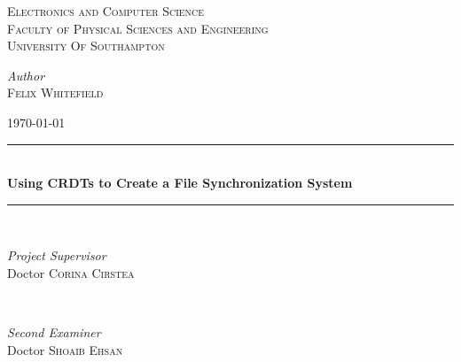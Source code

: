 \documentclass[12pt]{article}
\begin{document}
\begin{titlepage} %
    \newcommand{\HRule}{\rule{\linewidth}{0.5mm}} %

    \center %


    \textsc{\Large Electronics and Computer Science}\\[0.5cm] %

    \textsc{\large Faculty of Physical Sciences and Engineering}\\[0.5cm] %

    \textsc{\LARGE University Of Southampton}\\[1.5cm] %

    \begin{center}
        \large
        \textit{Author}\\
        \textsc{Felix Whitefield} %
    \end{center}
    {\large \today} %

    \vfill


    \HRule\\[0.4cm]

    {\huge\bfseries Using CRDTs to Create a File Synchronization System}\\[0.4cm] %

    \HRule\\[1cm]



    \vfill

    \begin{minipage}{0.45\textwidth}
        \begin{flushleft}
            \large
            \textit{Project Supervisor}\\
            Doctor \textsc{Corina Cirstea} %
        \end{flushleft}
    \end{minipage}
    ~
    \begin{minipage}{0.45\textwidth}
        \begin{flushright}
            \large
            \textit{Second Examiner}\\
            Doctor \textsc{Shoaib Ehsan} %
        \end{flushright}
    \end{minipage}


\end{titlepage}
\end{document}
